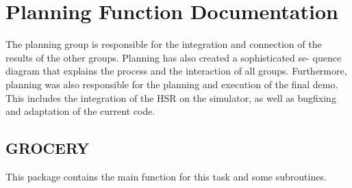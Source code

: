 \documentclass[main.tex]{subfiles}
\begin{document}
	\begingroup

	\renewcommand{\cleardoublepage}{}

	\renewcommand{\clearpage}{}
	
	\newpage

	\chapter{Planning Function Documentation}

		
		The planning group is responsible for the integration and connection of the
    results of the other groups. Planning has also created a sophisticated se-
    quence diagram that explains the process and the interaction of all groups.
    Furthermore, planning was also responsible for the planning and execution of the final demo. This
    includes the integration of the HSR on the simulator, as well as bugfixing and
    adaptation of the current code.
		
		\section{GROCERY}
		This package contains the main function for this task and some subroutines.
\end{document}
